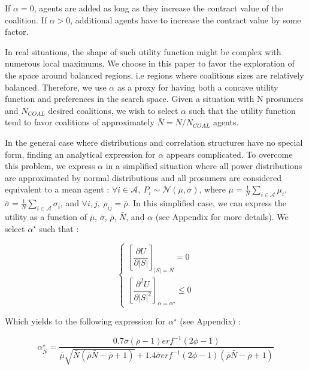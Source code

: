 \documentclass[journal]{IEEEtran}
\begin{document}
If $ \alpha = 0 $, agents are added as long as they increase the contract value of the coalition. If $ \alpha > 0 $, additional agents have to increase the contract value by some factor. 

In real situations, the shape of such utility function might be complex with numerous local maximums. We choose in this paper to favor the exploration of the space around balanced regions, i.e regions where coalitions sizes are relatively balanced. Therefore, we use $ \alpha $ as a proxy for having both a concave utility function and preferences in the search space. Given a situation with N prosumers and $ N_{COAL} $ desired coalitions, we wish to select $ \alpha $ such that the utility function tend to favor coalitions of approximately $ \bar{N}=N/N_{COAL} $ agents.

In the general case where distributions and correlation structures have no special form, finding an analytical expression for $ \alpha $ appears complicated. To overcome this problem, we express $ \alpha $ in a simplified situation where all power distributions are approximated by normal distributions and all prosumers are considered equivalent to a mean agent : $ \forall i \in \mathcal{A},\ P_i \sim \mathcal{N}(\bar{\mu}, \bar{\sigma}) $, where $ \bar{\mu} = \frac{1}{N} \sum_{i \in \mathcal{A}} \mu_i $, $ \bar{ \sigma } = \frac{1}{N} \sum_{i \in \mathcal{A}} \sigma_i $, and $\forall i,j,\ \rho_{ij} = \bar{\rho} $. In this simplified case, we can express the utility as a function of $ \bar{\mu} $, $ \bar{\sigma} $, $\bar{\rho} $, $ \bar{N} $, and $ \alpha $ (see Appendix for more details). We select $ \alpha^{\star} $ such that :

\begin{equation}
\left\{ \begin{array}{lll}
	          \left[ \dfrac{\partial{ U}}{ \partial{|S|}} \right]_{|S| = \bar{N}} = 0 \\
	          \left[ \dfrac{\partial^2 U}{\partial |S|^2} \right]_{ \alpha = \alpha^{\star} } \leq 0
	    \end{array} 
\right.
\label{eq:derivative}
\end{equation}

Which yields to the following expression for $ \alpha^{\star} $ (see Appendix) :

\footnotesize
\begin{equation}
\alpha^{\star}_{\bar{N}} = \dfrac{0.7 \bar{\sigma}(\bar{\rho}-1)erf^{-1}(2 \phi - 1)}{\bar{\mu}\sqrt{\bar{N}(\bar{\rho}\bar{N}-\bar{\rho}+1)}+1.4 \bar{\sigma} erf^{-1} (2 \phi -1 ) (\bar{\rho}\bar{N}-\bar{\rho} + 1)} 
\label{eq:alpha_star}
\end{equation}
\normalsize
\end{document}
